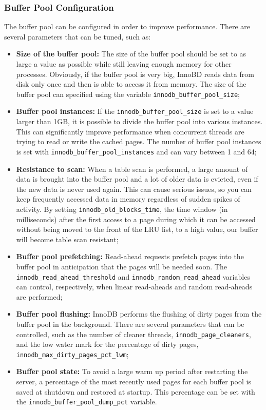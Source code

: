 \documentclass[12pt]{article}
\begin{document}
\subsubsection{Buffer Pool Configuration}
\label{bufferConfig}
The buffer pool can be configured in order to improve performance. There are several parameters that can be tuned, such as:
\begin{itemize}
    \item \textbf{Size of the buffer pool:} The size of the buffer pool should be set to as large a value as possible while still leaving enough memory for other processes. Obviously, if the buffer pool is very big, InnoBD reads data from disk only once and then is able to access it from memory. The size of the buffer pool can specified using the variable \verb|innodb_buffer_pool_size|;
    
    \item \textbf{Buffer pool instances:} If the \verb|innodb_buffer_pool_size| is set to a value larger than 1GB, it is possible to divide the buffer pool into various instances. This can significantly improve performance when concurrent threads are trying to read or write the cached pages. The number of buffer pool instances is set with \verb|innodb_buffer_pool_instances| and can vary between 1 and 64;
    
    \item \textbf{Resistance to scan:} When a table scan is performed, a large amount of data is brought into the buffer pool and a lot of older data is evicted, even if the new data is never used again. This can cause serious issues, so you can keep frequently accessed data in memory regardless of sudden spikes of activity. By setting \verb|innodb_old_blocks_time|, the time window (in milliseconds) after the first access to a page during which it can be accessed without being moved to the front of the LRU list, to a high value, our buffer will become table scan resistant;
    
    \item \textbf{Buffer pool prefetching:} Read-ahead requests prefetch pages into the buffer pool in anticipation that the pages will be needed soon. The \verb|innodb_read_ahead_threshold| and \verb|innodb_random_read_ahead| variables can control, respectively, when linear read-aheads and random read-aheads are performed;
    
    \item \textbf{Buffer pool flushing:} InnoDB performs the flushing of dirty pages from the buffer pool in the background. There are several parameters that can be controlled, such as the number of cleaner threads, \verb|innodb_page_cleaners|, and the low water mark for the percentage of dirty pages, \verb|innodb_max_dirty_pages_pct_lwm|;
    
    \item \textbf{Buffer pool state:} To avoid a large warm up period after restarting the server, a percentage of the most recently used pages for each buffer pool is saved at shutdown and restored at startup. This percentage can be set with the \verb|innodb_buffer_pool_dump_pct| variable.
    
\end{itemize}
\end{document}
